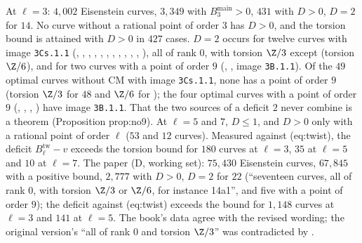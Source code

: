 \begin{sloppypar}
\begin{example}\label{ex:computation:repro-eis}
At $\ell=3$: $4{,}002$ Eisenstein curves, $3{,}349$ with $B^{\mathrm{main}}_3>0$, $431$ with $D>0$, $D=2$ for $14$. No curve without a rational point of order $3$ has $D>0$, and
the torsion bound is attained with $D>0$ in $427$ cases. $D=2$ occurs for twelve curves with image \texttt{3Cs.1.1} (, , ,
, , , , , , , , ), all of rank $0$, with torsion $\Z/3$
except  (torsion $\Z/6$), and for two curves with a point of order $9$ (, , image \texttt{3B.1.1}). Of the $49$ optimal curves
without CM with image \texttt{3Cs.1.1}, none has a point of order $9$ (torsion $\Z/3$ for $48$ and $\Z/6$ for ); the four optimal curves with a point of
order $9$ (, , , ) have image \texttt{3B.1.1}. That the two sources of a deficit $2$ never combine is a theorem
(Proposition prop:no9). At $\ell=5$ and $7$, $D\le1$, and $D>0$ only with a rational point of order $\ell$ ($53$ and $12$ curves). Measured against (eq:twist), the
deficit $B^{\mathrm{tw}}_\ell-v$ exceeds the torsion bound for $180$ curves at $\ell=3$, $35$ at $\ell=5$ and $10$ at $\ell=7$. The paper (D, working set): $75{,}430$
Eisenstein curves, $67{,}845$ with a positive bound, $2{,}777$ with $D>0$, $D=2$ for $22$ (``seventeen curves, all of rank $0$, with torsion $\Z/3$ or $\Z/6$, for
instance 14a1'', and five with a point of order $9$); the deficit against (eq:twist) exceeds the bound for $1{,}148$ curves at $\ell=3$ and $141$ at $\ell=5$. The
book's data agree with the revised wording; the original version's ``all of rank $0$ and torsion $\Z/3$'' was contradicted by .
\end{example}


\end{sloppypar}
